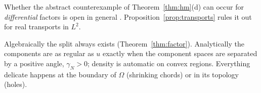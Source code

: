 \begin{caution}[title={Three or more components: what is still open}]
Whether the abstract counterexample of Theorem~\ref{thm:hm}(d) can occur for \emph{differential} factors is open in general \openq{} . Proposition~\ref{prop:transports} rules it out for real transports in $L^2$.
\end{caution}

\begin{keypoint}
Algebraically the split always exists (Theorem~\ref{thm:factor}). Analytically the components are as regular as $u$ exactly when the component spaces are separated by a positive angle, $\gamma_N>0$; density is automatic on convex regions. Everything delicate happens at the boundary of $\Omega$ (shrinking chords) or in its topology (holes).
\end{keypoint}
